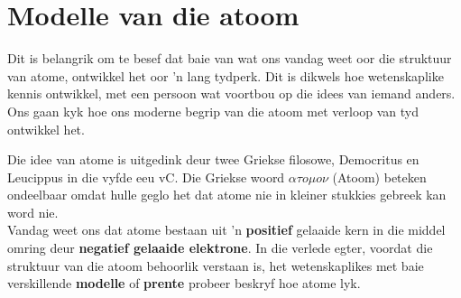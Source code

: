 \section{Modelle van die atoom}
            \nopagebreak
      \label{m38756*id254164}Dit is belangrik om te besef dat baie van wat ons vandag weet oor die struktuur van atome, ontwikkel het oor  'n lang tydperk. Dit is dikwels hoe wetenskaplike kennis ontwikkel, met een persoon wat voortbou op die idees van iemand anders. Ons gaan kyk hoe ons moderne begrip van die atoom met verloop van tyd ontwikkel het.\par 


      \label{m38756*id254508}
Die idee van atome is uitgedink deur twee Griekse filosowe, Democritus en Leucippus in die vyfde eeu vC. Die Griekse woord $\alpha \tau o\mu o\nu $ (Atoom) beteken ondeelbaar omdat hulle geglo het dat atome nie in kleiner stukkies gebreek kan word nie.\\
      \label{m38756*id254540}
Vandag weet ons dat atome bestaan uit  'n \textbf{positief} gelaaide kern in die middel omring deur \textbf{negatief gelaaide elektrone}. In die verlede egter, voordat die struktuur van die atoom behoorlik verstaan is, het wetenskaplikes met baie verskillende \textbf{modelle} of \textbf{prente} probeer beskryf hoe atome lyk.

